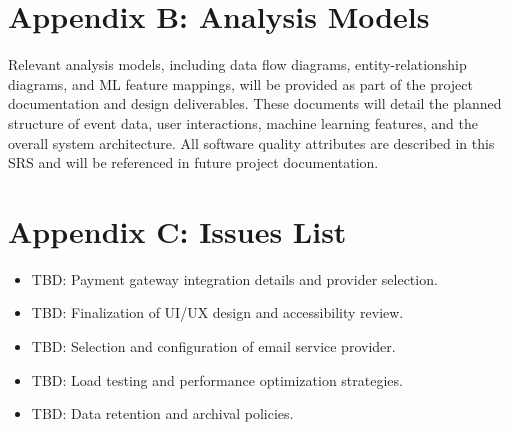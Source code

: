 \documentclass[11pt,a4paper]{article}
\begin{document}
\section{Appendix B: Analysis Models}

Relevant analysis models, including data flow diagrams, entity-relationship diagrams, and ML feature mappings, will be provided as part of the project documentation and design deliverables. These documents will detail the planned structure of event data, user interactions, machine learning features, and the overall system architecture. All software quality attributes are described in this SRS and will be referenced in future project documentation.

\section{Appendix C: Issues List}
\begin{itemize}
    \item TBD: Payment gateway integration details and provider selection.
    \item TBD: Finalization of UI/UX design and accessibility review.
    \item TBD: Selection and configuration of email service provider.
    \item TBD: Load testing and performance optimization strategies.
    \item TBD: Data retention and archival policies.
\end{itemize}
\end{document}
